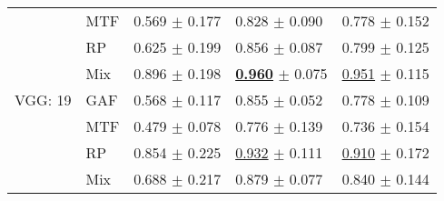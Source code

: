 \begin{tabular}[t]{lllll}
 & MTF & \textcolor[rgb]{0.7868803799,0.2131196201,0}{0.569} $\pm$ \textcolor[rgb]{0.6768896378,0.3231103622,0}{0.177} & \textcolor[rgb]{0.6747967480,0.3252032520,0}{0.828} $\pm$ \textcolor[rgb]{0.2405929417,0.5000000000,0}{0.090} & \textcolor[rgb]{0.7179487179,0.2820512821,0}{0.778} $\pm$ \textcolor[rgb]{0.3470343755,0.5000000000,0}{0.152} \\
 & RP & \textcolor[rgb]{0.6562778272,0.3437221728,0}{0.625} $\pm$ \textcolor[rgb]{0.7623521573,0.2376478427,0}{0.199} & \textcolor[rgb]{0.5325203252,0.4674796748,0}{0.856} $\pm$ \textcolor[rgb]{0.2226403475,0.5000000000,0}{0.087} & \textcolor[rgb]{0.6410256410,0.3589743590,0}{0.799} $\pm$ \textcolor[rgb]{0.1811818997,0.5000000000,0}{0.125} \\
 & Mix & \textcolor[rgb]{0.0195903829,0.5000000000,0}{0.896} $\pm$ \textcolor[rgb]{0.7578007605,0.2421992395,0}{0.198} & \underline{\textbf{\textcolor[rgb]{0.0000000000,0.5000000000,0}{0.960}}} $\pm$ \textcolor[rgb]{0.1431882304,0.5000000000,0}{0.075} & \underline{\textcolor[rgb]{0.0769230769,0.5000000000,0}{0.951}} $\pm$ \textcolor[rgb]{0.1159746586,0.5000000000,0}{0.115} \\
VGG: 19 & GAF & \textcolor[rgb]{0.7898486198,0.2101513802,0}{0.568} $\pm$ \textcolor[rgb]{0.4463877156,0.5000000000,0}{0.117} & \textcolor[rgb]{0.5365853659,0.4634146341,0}{0.855} $\pm$ \textcolor[rgb]{0.0032158844,0.5000000000,0}{0.052} & \textcolor[rgb]{0.7179487179,0.2820512821,0}{0.778} $\pm$ \textcolor[rgb]{0.0765276710,0.5000000000,0}{0.109} \\
 & MTF & \textcolor[rgb]{1.0000000000,0.0000000000,0}{0.479} $\pm$ \textcolor[rgb]{0.2975918104,0.5000000000,0}{0.078} & \textcolor[rgb]{0.9410569106,0.0589430894,0}{0.776} $\pm$ \textcolor[rgb]{0.5514159208,0.4485840792,0}{0.139} & \textcolor[rgb]{0.8717948718,0.1282051282,0}{0.736} $\pm$ \textcolor[rgb]{0.3598231789,0.5000000000,0}{0.154} \\
 & RP & \textcolor[rgb]{0.1175422974,0.5000000000,0}{0.854} $\pm$ \textcolor[rgb]{0.8604148146,0.1395851854,0}{0.225} & \underline{\textcolor[rgb]{0.1422764228,0.5000000000,0}{0.932}} $\pm$ \textcolor[rgb]{0.3739711043,0.5000000000,0}{0.111} & \underline{\textcolor[rgb]{0.2307692308,0.5000000000,0}{0.910}} $\pm$ \textcolor[rgb]{0.4708846452,0.5000000000,0}{0.172} \\
 & Mix & \textcolor[rgb]{0.5093499555,0.4906500445,0}{0.688} $\pm$ \textcolor[rgb]{0.8276249752,0.1723750248,0}{0.217} & \textcolor[rgb]{0.4146341463,0.5000000000,0}{0.879} $\pm$ \textcolor[rgb]{0.1596186962,0.5000000000,0}{0.077} & \textcolor[rgb]{0.4871794872,0.5000000000,0}{0.840} $\pm$ \textcolor[rgb]{0.2974495959,0.5000000000,0}{0.144} \\

\end{tabular}

